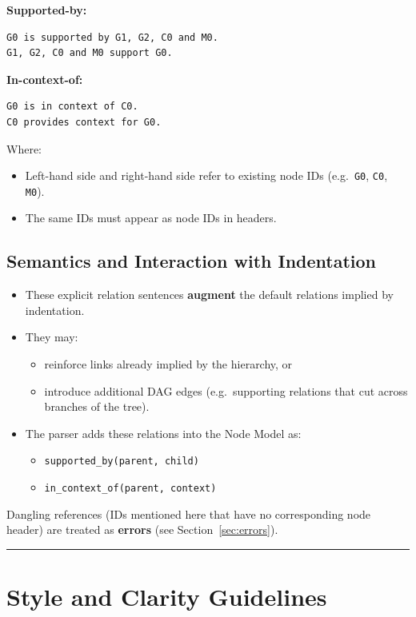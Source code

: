 \documentclass[11pt]{article}
\begin{document}
\textbf{Supported-by:}
\begin{verbatim}
G0 is supported by G1, G2, C0 and M0.
G1, G2, C0 and M0 support G0.
\end{verbatim}

\textbf{In-context-of:}
\begin{verbatim}
G0 is in context of C0.
C0 provides context for G0.
\end{verbatim}

Where:
\begin{itemize}[leftmargin=2em]
  \item Left-hand side and right-hand side refer to existing node IDs (e.g.\ \texttt{G0}, \texttt{C0}, \texttt{M0}).
  \item The same IDs must appear as node IDs in headers.
\end{itemize}

\subsection{Semantics and Interaction with Indentation}

\begin{itemize}[leftmargin=2em]
  \item These explicit relation sentences \textbf{augment} the default relations implied by indentation.
  \item They may:
  \begin{itemize}[leftmargin=1.5em]
    \item reinforce links already implied by the hierarchy, or
    \item introduce additional DAG edges (e.g.\ supporting relations that cut across branches of the tree).
  \end{itemize}
  \item The parser adds these relations into the Node Model as:
  \begin{itemize}[leftmargin=1.5em]
    \item \texttt{supported\_by(parent, child)}
    \item \texttt{in\_context\_of(parent, context)}
  \end{itemize}
\end{itemize}

Dangling references (IDs mentioned here that have no corresponding node header) are treated as \textbf{errors} (see Section~\ref{sec:errors}).

\bigskip
\hrule
\bigskip

\section{Style and Clarity Guidelines}
\end{document}
